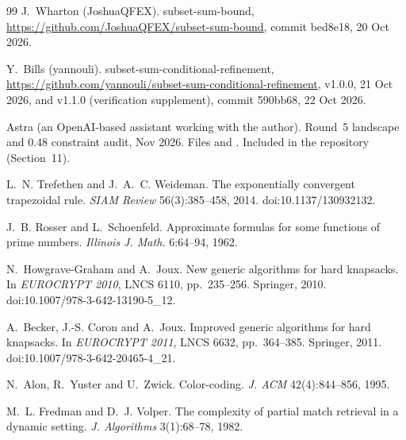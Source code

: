 \documentclass[11pt]{article}
\theoremstyle{plain}
\begin{document}
\begin{thebibliography}{99}
J.~Wharton (JoshuaQFEX). subset-sum-bound, \url{https://github.com/JoshuaQFEX/subset-sum-bound}, commit bed8e18, 20 Oct 2026.

Y.~Bills (yannouli). subset-sum-conditional-refinement, \url{https://github.com/yannouli/subset-sum-conditional-refinement}, v1.0.0, 21 Oct 2026, and v1.1.0 (verification supplement), commit 590bb68, 22 Oct 2026.

Astra (an OpenAI-based assistant working with the author). Round~5 landscape and 0.48 constraint audit, Nov 2026. Files  and . Included in the repository (Section~11).

L.~N. Trefethen and J.~A.~C. Weideman. The exponentially convergent trapezoidal rule. \emph{SIAM Review} 56(3):385--458, 2014. doi:10.1137/130932132.

J.~B. Rosser and L.~Schoenfeld. Approximate formulas for some functions of prime numbers. \emph{Illinois J. Math.} 6:64--94, 1962.

N.~Howgrave-Graham and A.~Joux. New generic algorithms for hard knapsacks. In \emph{EUROCRYPT 2010}, LNCS 6110, pp.~235--256. Springer, 2010. doi:10.1007/978-3-642-13190-5\_12.

A.~Becker, J.-S. Coron and A.~Joux. Improved generic algorithms for hard knapsacks. In \emph{EUROCRYPT 2011}, LNCS 6632, pp.~364--385. Springer, 2011. doi:10.1007/978-3-642-20465-4\_21.

N.~Alon, R.~Yuster and U.~Zwick. Color-coding. \emph{J. ACM} 42(4):844--856, 1995.

M.~L. Fredman and D.~J. Volper. The complexity of partial match retrieval in a dynamic setting. \emph{J. Algorithms} 3(1):68--78, 1982.

\end{thebibliography}
\end{document}

